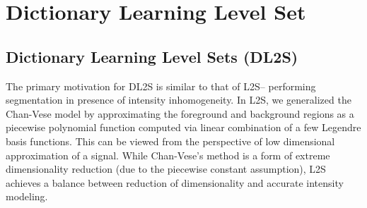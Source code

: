 
\chapter{Dictionary Learning Level Set} %

\label{AppendixDL2S} %


\section{Dictionary Learning Level Sets (DL2S)}

The primary motivation for DL2S is similar to that of L2S-- performing segmentation in presence of intensity inhomogeneity. In L2S\cite{mukherjee_L2S}, we generalized the Chan-Vese model by approximating the foreground and background regions as a piecewise polynomial function  computed via linear combination of a few Legendre basis functions. This can be viewed from the perspective of low dimensional approximation of a signal.  While Chan-Vese's method is a form of extreme dimensionality reduction (due to the piecewise constant assumption), L2S achieves a balance between reduction of dimensionality and accurate intensity modeling. 

